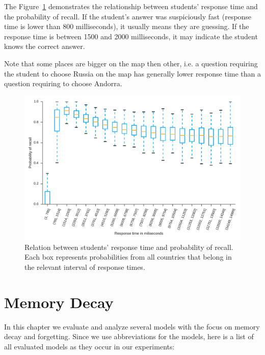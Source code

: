 The Figure~\ref{fig-response-time} demonstrates the relationship between students' response time and the probability of recall. If the student's answer was suspiciously fast (response time is lower than 800 milliseconds), it usually means they are guessing. If the response time is between 1500 and 2000 milliseconds, it may indicate the student knows the correct answer.

Note that some places are bigger on the map then other, i.e. a question requiring the student to choose Russia on the map has generally lower response time than a question requiring to choose Andorra.

\begin{figure}[htbp]
  \centering
  \includegraphics[width=\textwidth]{img/response-time}
  \caption{Relation between students' response time and probability of recall. Each box represents probabilities from all countries that belong in the relevant interval of response times.}
  \label{fig-response-time}
\end{figure}

\section{Memory Decay}

In this chapter we evaluate and analyze several models with the focus on memory decay and forgetting. Since we use abbreviations for the models, here is a list of all evaluated models as they occur in our experiments:

